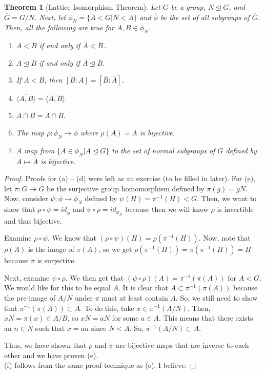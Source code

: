 \documentclass[11pt,leqno,oneside]{amsart}
\newcommand{\subgroup}{\mathrel{<}}
\newcommand{\normsubgroup}{\mathrel{\unlhd}}
\newtheorem{thm}{Theorem}[subsection]
\theoremstyle{definition}
\numberwithin{equation}{section}
\begin{document}
\begin{thm}[Lattice Isomorphism Theorem]
    Let $G$ be a group, $N \normsubgroup G$, and $\overline{G} = G/N$. Next, let
    $\phi_N = \{ A \subgroup G | N \subgroup A \}$ and $\overline{\phi}$ be the
    set of all subgroups of $\overline{G}$. Then, all the following are true for $A,B \in \phi_N$.
    \begin{enumerate}[label=(\alph*)]
        \item $A \subgroup B$ if and only if $\overline{A} \subgroup \overline{B}$..
        \item $A \normsubgroup B$ if and only if $\overline{A} \normsubgroup
            \overline{B}$.
        \item If $A \subgroup B$, then $[B:A] = [\overline{B}:\overline{A}]$.
        \item $\overline{\langle A, B \rangle} = \langle \overline{A}, \overline{B} \rangle$
        \item $\overline{A \cap B} = \overline{A} \cap \overline{B}$.
        \item The map $\rho: \phi_N \to \overline{\phi}$ where $\rho(A) =
            \overline{A}$ is bijective.
        \item A map from $\{ A \in \phi_N | A \normsubgroup G\}$ to the set of
            normal subgroups of $\overline{G}$ defined by $A \mapsto
            \overline{A}$ is bijective.
    \end{enumerate}
\end{thm}
\begin{proof}
    Proofs for (a) -- (d) were left as an exercise (to be filled in later).
    For (e), let $\pi: G \twoheadrightarrow \overline{G}$ be the surjective
    group homomorphism defined by $\pi(g) = gN$. Now, consider $\psi:
    \overline{\phi} \to \phi_N$ defined by $\psi(H) = \pi^{-1}(H) \subgroup G$.
    Then, we want to show that $\rho \circ \psi = id_{\overline{\phi}}$ and
    $\psi \circ \rho = id_{\phi_N}$ because then we will know $\rho$ is
    invertible and thus bijective.

    Examine $\rho \circ \psi$. We know that $(\rho \circ \psi)(H) =
    \rho(\pi^{-1}(H))$. Now, note that $\rho(A)$ is the image of $\pi(A)$, so
    we get $\rho(\pi^{-1}(H)) = \pi(\pi^{-1}(H)) = H$ because $\pi$ is
    surjective.

    Next, examine $\psi \circ \rho$. We then get that $(\psi \circ \rho)(A) =
    \pi^{-1}(\pi(A))$ for $A \subgroup G$. We would like for this to be equal
    $A$. It is clear that $A \subset \pi^{-1}(\pi(A))$ because the pre-image of
    $A/N$ under $\pi$ must at least contain $A$. So, we still need to show that
    $\pi^{-1}(\pi(A)) \subset A$. To do this, take $x \in \pi^{-1}(A/N)$. Then,
    $xN = \pi(x) \in A/B$, so $xN = aN$ for some $a \in A$. This means that
    there exists an $n \in N$ such that $x = an$ since $N \subgroup A$. So,
    $\pi^{-1}(A/N) \subset A$.

    Thus, we have shown that $\rho$ and $\psi$ are bijective maps that are
    inverse to each other and we have proven (e). \\

    (f) follows from the same proof technique as (e), I believe.
\end{proof}
\end{document}

